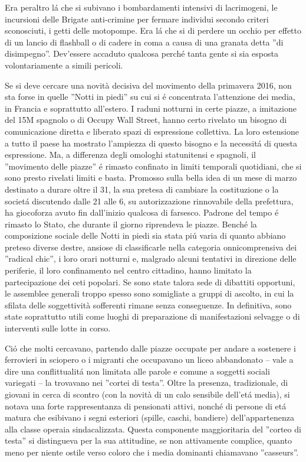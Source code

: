Era peraltro l\'a che si subivano i bombardamenti intensivi di lacrimogeni, le incursioni delle Brigate anti-crimine per fermare individui secondo criteri sconosciuti, i getti delle motopompe. Era l\'a che si  di perdere un occhio per effetto di un lancio di flashball o di cadere in coma a causa di una granata detta ''di disimpegno''. Dev’essere accaduto qualcosa perch\'e tanta gente si sia esposta volontariamente a simili pericoli.

Se si deve cercare una novità decisiva del movimento della primavera 2016, non sta forse in quelle ''Notti in piedi'' su cui si \'e concentrata l’attenzione dei media, in Francia e soprattutto all’estero. I raduni notturni in certe piazze, a imitazione del 15M spagnolo o di Occupy Wall Street, hanno certo rivelato un bisogno di comunicazione diretta e liberato spazi di espressione collettiva. La loro estensione a tutto il paese ha mostrato l’ampiezza di questo bisogno e la necessit\'a di questa espressione. Ma, a differenza degli omologhi statunitensi e spagnoli, il ''movimento delle piazze'' \'e rimasto confinato in limiti temporali quotidiani, che si sono presto rivelati limiti e basta. Promosso sulla bella idea di un mese di marzo destinato a durare oltre il 31, la sua pretesa di cambiare la costituzione o la societ\'a discutendo dalle 21 alle 6, su autorizzazione rinnovabile della prefettura, ha giocoforza avuto fin dall’inizio qualcosa di farsesco. Padrone del tempo \'e rimasto lo Stato, che durante il giorno riprendeva le piazze. Bench\'e la composizione sociale delle Notti in piedi sia stata pi\'u varia di quanto abbiano preteso diverse destre, ansiose di classificarle nella categoria onnicomprensiva dei ''radical chic'', i loro orari notturni e, malgrado alcuni tentativi in direzione delle periferie, il loro confinamento nel centro cittadino, hanno limitato la partecipazione dei ceti popolari. Se sono state talora sede di dibattiti opportuni, le assemblee generali troppo spesso sono somigliate a gruppi di ascolto, in cui la sfilata delle soggettività sofferenti rimane senza conseguenze. In definitiva, sono state soprattutto utili come luoghi di preparazione di manifestazioni selvagge o di interventi sulle lotte in corso.

Ci\'o che molti cercavano, partendo dalle piazze occupate per andare a sostenere i ferrovieri in sciopero o i migranti che occupavano un liceo abbandonato – vale a dire una conflittualit\'a non limitata alle parole e comune a soggetti sociali variegati – la trovavano nei ''cortei di testa''. Oltre la presenza, tradizionale, di giovani in cerca di scontro (con la novità di un calo sensibile dell’et\'a media), si notava una forte rappresentanza di pensionati attivi, nonch\'e di persone di et\'a matura che esibivano i segni esteriori (spille, caschi, bandiere) dell’appartenenza alla classe operaia sindacalizzata. Questa componente maggioritaria del ''corteo di testa'' si distingueva per la sua attitudine, se non attivamente complice, quanto meno per niente ostile verso coloro che i media dominanti chiamavano ''casseurs''.

